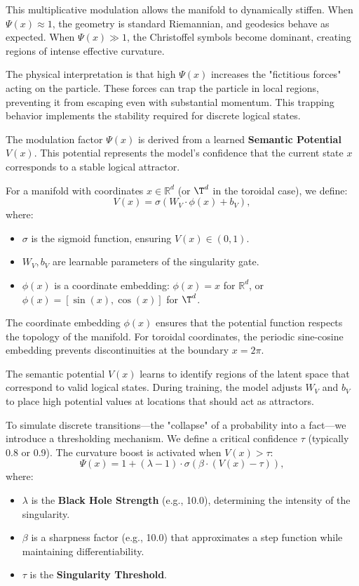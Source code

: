 \documentclass[12pt,letterpaper,twoside]{article}
\newcommand{\R}{\mathbb{R}}
\begin{document}
This multiplicative modulation allows the manifold to dynamically stiffen. When $\Psi(x) \approx 1$, the geometry is standard Riemannian, and geodesics behave as expected. When $\Psi(x) \gg 1$, the Christoffel symbols become dominant, creating regions of intense effective curvature.

The physical interpretation is that high $\Psi(x)$ increases the "fictitious forces" acting on the particle. These forces can trap the particle in local regions, preventing it from escaping even with substantial momentum. This trapping behavior implements the stability required for discrete logical states.

The modulation factor $\Psi(x)$ is derived from a learned \textbf{Semantic Potential} $V(x)$. This potential represents the model's confidence that the current state $x$ corresponds to a stable logical attractor.

For a manifold with coordinates $x \in \R^d$ (or $\T^d$ in the toroidal case), we define:
\begin{equation}
V(x) = \sigma(W_V \cdot \phi(x) + b_V),
\end{equation}
where:
\begin{itemize}
    \item $\sigma$ is the sigmoid function, ensuring $V(x) \in (0, 1)$.
    \item $W_V, b_V$ are learnable parameters of the singularity gate.
    \item $\phi(x)$ is a coordinate embedding: $\phi(x) = x$ for $\R^d$, or $\phi(x) = [\sin(x), \cos(x)]$ for $\T^d$.
\end{itemize}

The coordinate embedding $\phi(x)$ ensures that the potential function respects the topology of the manifold. For toroidal coordinates, the periodic sine-cosine embedding prevents discontinuities at the boundary $x = 2\pi$.

The semantic potential $V(x)$ learns to identify regions of the latent space that correspond to valid logical states. During training, the model adjusts $W_V$ and $b_V$ to place high potential values at locations that should act as attractors.

To simulate discrete transitions—the "collapse" of a probability into a fact—we introduce a thresholding mechanism. We define a critical confidence $\tau$ (typically 0.8 or 0.9). The curvature boost is activated when $V(x) > \tau$:
\begin{equation}
\Psi(x) = 1 + (\lambda - 1) \cdot \sigma\left(\beta \cdot (V(x) - \tau)\right),
\end{equation}
where:
\begin{itemize}
    \item $\lambda$ is the \textbf{Black Hole Strength} (e.g., 10.0), determining the intensity of the singularity.
    \item $\beta$ is a sharpness factor (e.g., 10.0) that approximates a step function while maintaining differentiability.
    \item $\tau$ is the \textbf{Singularity Threshold}.
\end{itemize}
\end{document}
